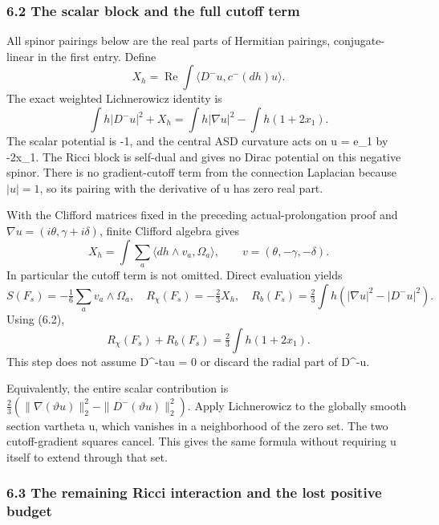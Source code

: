 \documentclass[
  10pt,
]{article}
\begin{document}
\hypertarget{the-scalar-block-and-the-full-cutoff-term}{%
\subsubsection{6.2 The scalar block and the full cutoff
term}\label{the-scalar-block-and-the-full-cutoff-term}}

All spinor pairings below are the real parts of Hermitian pairings,
conjugate-linear in the first entry. Define \[
 X_h=\operatorname{Re}\int
        \langle D^-u,c^-(dh)u\rangle.
\] The exact weighted Lichnerowicz identity is \[
 \int h|D^-u|^2+X_h
      =\int h|\nabla u|^2-\int h(1+2x_1).                \tag{6.2}
\] The scalar potential is -1, and the central ASD curvature acts on u =
e\_1 by -2x\_1. The Ricci block is self-dual and gives no Dirac
potential on this negative spinor. There is no gradient-cutoff term from
the connection Laplacian because \(|u|=1\), so its pairing with the
derivative of u has zero real part.

With the Clifford matrices fixed in the preceding actual-prolongation
proof and \(\nabla u=(i\theta,\gamma+i\delta)\), finite Clifford algebra
gives \[
 X_h=\int\sum_a\langle dh\wedge v_a,\Omega_a\rangle,
                     \qquad v=(\theta,-\gamma,-\delta).
\] In particular the cutoff term is not omitted. Direct evaluation
yields \[
 S(F_s)=-\tfrac16\sum_a v_a\wedge\Omega_a,
 \quad R_\chi(F_s)=-\tfrac23 X_h,
 \quad R_b(F_s)=\tfrac23\int h(|\nabla u|^2-|D^-u|^2).
\] Using (6.2), \[
 \boxed{R_\chi(F_s)+R_b(F_s)=\tfrac23\int h(1+2x_1).}    \tag{6.3}
\] This step does not assume D\^{}-tau = 0 or discard the radial part of
D\^{}-u.

Equivalently, the entire scalar contribution is
\(\tfrac23(\|\nabla(\vartheta u)\|_2^2 -\|D^-(\vartheta u)\|_2^2)\).
Apply Lichnerowicz to the globally smooth section vartheta u, which
vanishes in a neighborhood of the zero set. The two cutoff-gradient
squares cancel. This gives the same formula without requiring u itself
to extend through that set.

\hypertarget{the-remaining-ricci-interaction-and-the-lost-positive-budget}{%
\subsubsection{6.3 The remaining Ricci interaction and the lost positive
budget}\label{the-remaining-ricci-interaction-and-the-lost-positive-budget}}
\end{document}
